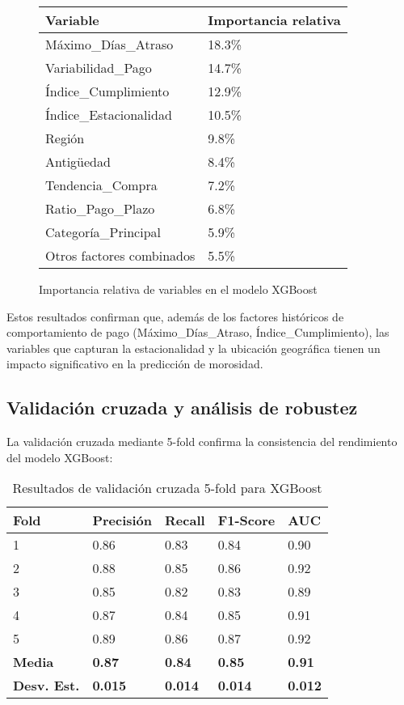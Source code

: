 \begin{figure}[ht]
\centering
\begin{tabular}{|p{6cm}|p{3cm}|}
\hline
\textbf{Variable} & \textbf{Importancia relativa} \\
\hline
Máximo\_Días\_Atraso & 18.3\% \\
\hline
Variabilidad\_Pago & 14.7\% \\
\hline
Índice\_Cumplimiento & 12.9\% \\
\hline
Índice\_Estacionalidad & 10.5\% \\
\hline
Región & 9.8\% \\
\hline
Antigüedad & 8.4\% \\
\hline
Tendencia\_Compra & 7.2\% \\
\hline
Ratio\_Pago\_Plazo & 6.8\% \\
\hline
Categoría\_Principal & 5.9\% \\
\hline
Otros factores combinados & 5.5\% \\
\hline
\end{tabular}
\caption{Importancia relativa de variables en el modelo XGBoost}
\end{figure}

Estos resultados confirman que, además de los factores históricos de comportamiento de pago (Máximo\_Días\_Atraso, Índice\_Cumplimiento), las variables que capturan la estacionalidad y la ubicación geográfica tienen un impacto significativo en la predicción de morosidad.

\subsection{Validación cruzada y análisis de robustez}
La validación cruzada mediante 5-fold confirma la consistencia del rendimiento del modelo XGBoost:

\begin{table}[ht]
\centering
\begin{tabular}{|p{2cm}|p{2cm}|p{2cm}|p{2cm}|p{2cm}|}
\hline
\textbf{Fold} & \textbf{Precisión} & \textbf{Recall} & \textbf{F1-Score} & \textbf{AUC} \\
\hline
1 & 0.86 & 0.83 & 0.84 & 0.90 \\
\hline
2 & 0.88 & 0.85 & 0.86 & 0.92 \\
\hline
3 & 0.85 & 0.82 & 0.83 & 0.89 \\
\hline
4 & 0.87 & 0.84 & 0.85 & 0.91 \\
\hline
5 & 0.89 & 0.86 & 0.87 & 0.92 \\
\hline
\textbf{Media} & \textbf{0.87} & \textbf{0.84} & \textbf{0.85} & \textbf{0.91} \\
\hline
\textbf{Desv. Est.} & \textbf{0.015} & \textbf{0.014} & \textbf{0.014} & \textbf{0.012} \\
\hline
\end{tabular}
\caption{Resultados de validación cruzada 5-fold para XGBoost}
\end{table}

